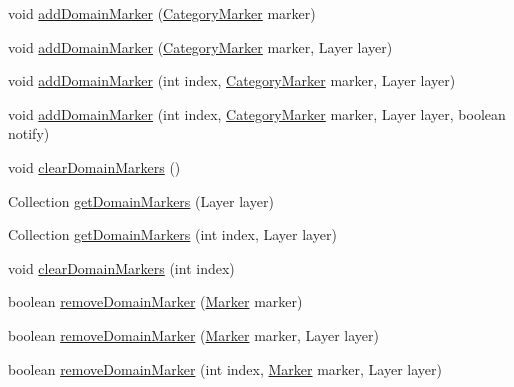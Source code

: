 \begin{DoxyCompactItemize}
\item 
void \mbox{\hyperlink{classorg_1_1jfree_1_1chart_1_1plot_1_1_category_plot_a2fb7552beaad280581bcd911d984d956}{add\+Domain\+Marker}} (\mbox{\hyperlink{classorg_1_1jfree_1_1chart_1_1plot_1_1_category_marker}{Category\+Marker}} marker)
\item 
void \mbox{\hyperlink{classorg_1_1jfree_1_1chart_1_1plot_1_1_category_plot_a81f52af147abe363a5627f27a43e0dd2}{add\+Domain\+Marker}} (\mbox{\hyperlink{classorg_1_1jfree_1_1chart_1_1plot_1_1_category_marker}{Category\+Marker}} marker, Layer layer)
\item 
void \mbox{\hyperlink{classorg_1_1jfree_1_1chart_1_1plot_1_1_category_plot_a52edd66f5b4591450ec05edae8ff0be4}{add\+Domain\+Marker}} (int index, \mbox{\hyperlink{classorg_1_1jfree_1_1chart_1_1plot_1_1_category_marker}{Category\+Marker}} marker, Layer layer)
\item 
void \mbox{\hyperlink{classorg_1_1jfree_1_1chart_1_1plot_1_1_category_plot_aa92636c28aa7155d3bd76bb8d421076e}{add\+Domain\+Marker}} (int index, \mbox{\hyperlink{classorg_1_1jfree_1_1chart_1_1plot_1_1_category_marker}{Category\+Marker}} marker, Layer layer, boolean notify)
\item 
void \mbox{\hyperlink{classorg_1_1jfree_1_1chart_1_1plot_1_1_category_plot_adf28326359bc5e6dd6a3584db74629c7}{clear\+Domain\+Markers}} ()
\item 
Collection \mbox{\hyperlink{classorg_1_1jfree_1_1chart_1_1plot_1_1_category_plot_af84d9f985f71bc0f0e11d52f4f505d91}{get\+Domain\+Markers}} (Layer layer)
\item 
Collection \mbox{\hyperlink{classorg_1_1jfree_1_1chart_1_1plot_1_1_category_plot_adebc94ca184b69f6244251d281b847a7}{get\+Domain\+Markers}} (int index, Layer layer)
\item 
void \mbox{\hyperlink{classorg_1_1jfree_1_1chart_1_1plot_1_1_category_plot_a32b248b8669388ee35fead74182cd8d0}{clear\+Domain\+Markers}} (int index)
\item 
boolean \mbox{\hyperlink{classorg_1_1jfree_1_1chart_1_1plot_1_1_category_plot_a2e59f00b94ab84347d6adc1a727399c0}{remove\+Domain\+Marker}} (\mbox{\hyperlink{classorg_1_1jfree_1_1chart_1_1plot_1_1_marker}{Marker}} marker)
\item 
boolean \mbox{\hyperlink{classorg_1_1jfree_1_1chart_1_1plot_1_1_category_plot_a215d9c4db6ebf44f951eb29dac9dcced}{remove\+Domain\+Marker}} (\mbox{\hyperlink{classorg_1_1jfree_1_1chart_1_1plot_1_1_marker}{Marker}} marker, Layer layer)
\item 
boolean \mbox{\hyperlink{classorg_1_1jfree_1_1chart_1_1plot_1_1_category_plot_ac914fcb2271aaed1fb7f1af448b7b593}{remove\+Domain\+Marker}} (int index, \mbox{\hyperlink{classorg_1_1jfree_1_1chart_1_1plot_1_1_marker}{Marker}} marker, Layer layer)

\end{DoxyCompactItemize}
